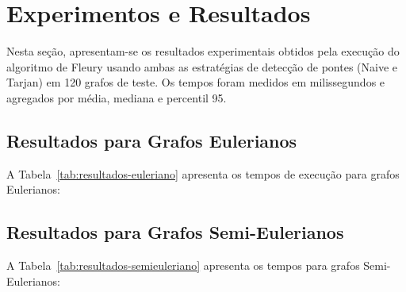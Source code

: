 \documentclass{sbc2023}%
\begin{document}
\section{Experimentos e Resultados}

Nesta seção, apresentam-se os resultados experimentais obtidos pela execução do algoritmo de Fleury usando ambas as estratégias de detecção de pontes (Naive e Tarjan) em 120 grafos de teste. Os tempos foram medidos em milissegundos e agregados por média, mediana e percentil 95.
\subsection{Resultados para Grafos Eulerianos}

A Tabela~\ref{tab:resultados-euleriano} apresenta os tempos de execução para grafos Eulerianos:
\begin{table}[H]
\centering
\caption{Tempos de execução (ms) para grafos Eulerianos}
\label{tab:resultados-euleriano}


\end{table}

\subsection{Resultados para Grafos Semi-Eulerianos}

A Tabela~\ref{tab:resultados-semieuleriano} apresenta os tempos para grafos Semi-Eulerianos:
\end{document}
